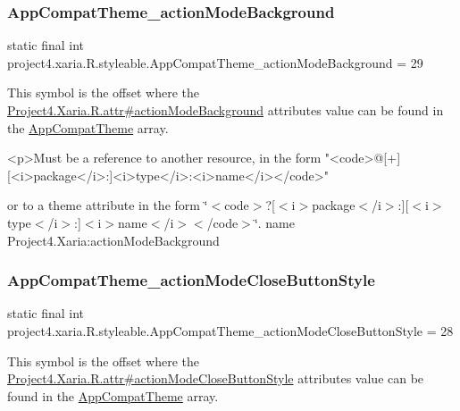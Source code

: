 \subsubsection{\texorpdfstring{App\+Compat\+Theme\+\_\+action\+Mode\+Background}{AppCompatTheme\_actionModeBackground}}
{\footnotesize\ttfamily static final int project4.\+xaria.\+R.\+styleable.\+App\+Compat\+Theme\+\_\+action\+Mode\+Background = 29\hspace{0.3cm}{\ttfamily [static]}}

This symbol is the offset where the \hyperlink{}{Project4.\+Xaria.\+R.\+attr\#action\+Mode\+Background} attribute\textquotesingle{}s value can be found in the \hyperlink{classproject4_1_1xaria_1_1R_1_1styleable_aad8bec413e2350f9404e6ff0e831a85d}{App\+Compat\+Theme} array.

\begin{DoxyVerb}      <p>Must be a reference to another resource, in the form "<code>@[+][<i>package</i>:]<i>type</i>:<i>name</i></code>"
\end{DoxyVerb}
 or to a theme attribute in the form \char`\"{}$<$code$>$?\mbox{[}$<$i$>$package$<$/i$>$\+:\mbox{]}\mbox{[}$<$i$>$type$<$/i$>$\+:\mbox{]}$<$i$>$name$<$/i$>$$<$/code$>$\char`\"{}.  name Project4.\+Xaria\+:action\+Mode\+Background \mbox{\label{classproject4_1_1xaria_1_1R_1_1styleable_a8f8cf06f9ecf3ab9f45c305f87f20707}} 
\subsubsection{\texorpdfstring{App\+Compat\+Theme\+\_\+action\+Mode\+Close\+Button\+Style}{AppCompatTheme\_actionModeCloseButtonStyle}}
{\footnotesize\ttfamily static final int project4.\+xaria.\+R.\+styleable.\+App\+Compat\+Theme\+\_\+action\+Mode\+Close\+Button\+Style = 28\hspace{0.3cm}{\ttfamily [static]}}

This symbol is the offset where the \hyperlink{}{Project4.\+Xaria.\+R.\+attr\#action\+Mode\+Close\+Button\+Style} attribute\textquotesingle{}s value can be found in the \hyperlink{classproject4_1_1xaria_1_1R_1_1styleable_aad8bec413e2350f9404e6ff0e831a85d}{App\+Compat\+Theme} array.

